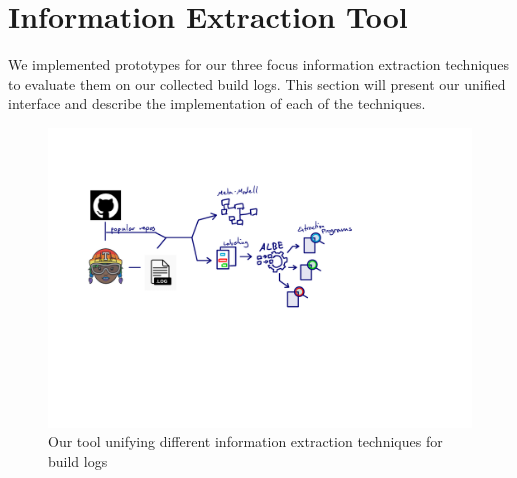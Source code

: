 \documentclass[\myrootdir/main.tex]{subfiles}
\begin{document}
\chapter{Information Extraction Tool}
\label{sec:implementation}
We implemented prototypes for our three focus information extraction techniques to evaluate them on our collected build logs.
This section will present our unified interface and describe the implementation of each of the techniques.


\begin{figure}[h]
	\centering
	\includegraphics[page=7, width=\textwidth, trim={0.5cm 0.5cm 0.5cm 0.5cm}, clip]{img/flow-of-research.pdf}
	\caption{Our tool unifying different information extraction techniques for build logs}
	\label{fig:tool}
\end{figure}
\end{document}
